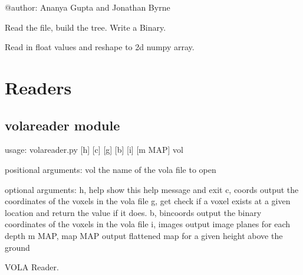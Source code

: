\documentclass[letterpaper,10pt,english]{sphinxmanual}
\begin{document}
@author: Ananya Gupta and Jonathan Byrne

\begin{fulllineitems}
\label{\detokenize{kitti2vola:kitti2vola.main}}
Read the file, build the tree. Write a Binary.

\end{fulllineitems}


\begin{fulllineitems}
\label{\detokenize{kitti2vola:kitti2vola.parse_bin}}
Read in float values and reshape to 2d numpy array.

\end{fulllineitems}



\chapter{Readers}
\label{\detokenize{index:readers}}

\section{volareader module}
\label{\detokenize{volareader::doc}}\label{\detokenize{volareader:volareader-module}}
\begin{sphinxVerbatim}[commandchars=\\\{\}]
usage: volareader.py [\PYGZhy{}h] [\PYGZhy{}c] [\PYGZhy{}g] [\PYGZhy{}b] [\PYGZhy{}i] [\PYGZhy{}m MAP] vol

positional arguments:
  vol                the name of the vola file to open

optional arguments:
  \PYGZhy{}h, \PYGZhy{}\PYGZhy{}help         show this help message and exit
  \PYGZhy{}c, \PYGZhy{}\PYGZhy{}coords       output the coordinates of the voxels in the vola file
  \PYGZhy{}g, \PYGZhy{}\PYGZhy{}get          check if a voxel exists at a given location and return
                     the value if it does.
  \PYGZhy{}b, \PYGZhy{}\PYGZhy{}bincoords    output the binary coordinates of the voxels in the vola
                     file
  \PYGZhy{}i, \PYGZhy{}\PYGZhy{}images       output image planes for each depth
  \PYGZhy{}m MAP, \PYGZhy{}\PYGZhy{}map MAP  output flattened map for a given height above the ground
\end{sphinxVerbatim}
\label{\detokenize{volareader:module-volareader}}
VOLA Reader.
\end{document}
